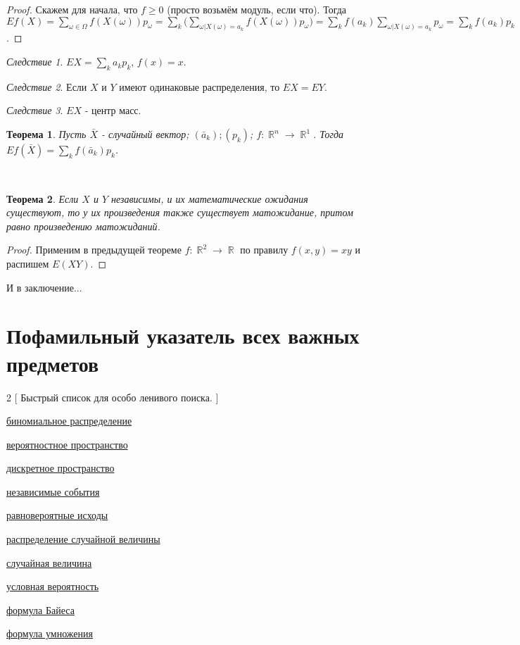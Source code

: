 \documentclass[a4paper,100pt]{article}
\theoremstyle{indented}
\newtheorem{theorem}{Теорема}
\theoremstyle{definition}
\theoremstyle{remark}
\newtheorem{cons}{Следствие}
\DeclareMathOperator{\RR}{\mathbb{R}}
\begin{document}
\begin{proof}
    Скажем для начала, что $f\geq 0$ (просто возьмём модуль, если что). Тогда $E f(X)=\sum_{\omega \in \Omega} f(X(\omega))p_\omega = \sum_k \biggl( \sum_{\omega|X(\omega) = a_k} f(X(\omega)) p_\omega\biggr) = \sum_k f(a_k) \sum_{\omega | X(\omega)=a_k}p_\omega = \sum_k f(a_k)p_k$. 
\end{proof}

\begin{cons}
    $EX=\sum_k a_k p_k$, $f(x)=x$. 
\end{cons}

\begin{cons}
    Если $X$ и $Y$ имеют одинаковые распределения, то $EX=EY$. 
\end{cons}

\begin{cons}
    $EX$ - центр масс.
\end{cons}

\begin{theorem}
    Пусть $\bar{X}$ - случайный вектор; $(\bar{a}_k); (p_k)$; $f:\RR^n \rightarrow \RR^1$. Тогда $Ef(\bar{X}) = \sum_k f(\bar{a}_k)p_k$. 
\end{theorem} \

\begin{theorem}
    Если $X$ и $Y$ независимы, и их математические ожидания существуют, то у их произведения также существует матожидание, притом равно произведению матожиданий.
\end{theorem}

\begin{proof}
    Применим в предыдущей теореме $f: \RR^2 \rightarrow \RR$ по правилу $f(x, y)=xy$ и распишем $E(XY)$. 
\end{proof}

\newpage

\hypertarget{t2}{И в заключение...}

\section{Пофамильный указатель всех важных предметов}

\begin{multicols}{2}
    [
    Быстрый список для особо ленивого поиска.
    ]

    \hyperlink{n1}{биномиальное распределение}\
    
    \hyperlink{n1}{вероятностное пространство}\
    
    \hyperlink{n2}{дискретное пространство}\

    \hyperlink{n7}{независимые события}\

    \hyperlink{n3}{равновероятные исходы}\

    \hyperlink{n1}{распределение случайной величины}\

    \hyperlink{n8}{случайная величина}\

    \hyperlink{n4}{условная вероятность}\

    \hyperlink{n5}{формула Байеса}\

    \hyperlink{n6}{формула умножения}\



\end{multicols}
\end{document}

